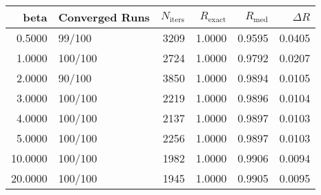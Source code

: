 \begin{tabular}{rlrrrr}
\toprule
beta & Converged Runs & $N_{\text{iters}}$ & $R_{\text{exact}}$ & $R_{\text{med}}$ & $\Delta R$ \\
\midrule
0.5000 & 99/100 & 3209 & 1.0000 & 0.9595 & 0.0405 \\
1.0000 & 100/100 & 2724 & 1.0000 & 0.9792 & 0.0207 \\
2.0000 & 90/100 & 3850 & 1.0000 & 0.9894 & 0.0105 \\
3.0000 & 100/100 & 2219 & 1.0000 & 0.9896 & 0.0104 \\
4.0000 & 100/100 & 2137 & 1.0000 & 0.9897 & 0.0103 \\
5.0000 & 100/100 & 2256 & 1.0000 & 0.9897 & 0.0103 \\
10.0000 & 100/100 & 1982 & 1.0000 & 0.9906 & 0.0094 \\
20.0000 & 100/100 & 1945 & 1.0000 & 0.9905 & 0.0095 \\
\bottomrule
\end{tabular}

